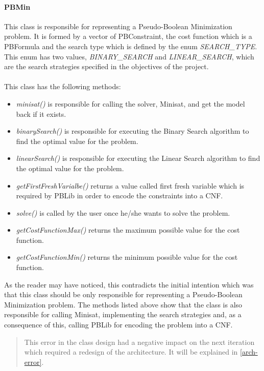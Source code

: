 


\paragraph{PBMin} 

This class is responsible for representing a Pseudo-Boolean Minimization problem.  It is formed by a vector of PBConstraint, the cost function which is a PBFormula and the search type which is defined by the enum \emph{SEARCH\_TYPE}.  \\
This enum has two values, \emph{BINARY\_SEARCH} and \emph{LINEAR\_SEARCH}, which are the search strategies specified in the objectives of the project.  \\\\
This class has the following methods: 
\begin{itemize}
	\item \emph{minisat()} is responsible for calling the solver, Minisat, and get the model back if it exists.
	\item \emph{binarySearch()} is responsible for executing the Binary Search algorithm to find the optimal value for the problem.
	\item \emph{linearSearch()} is responsible for executing the Linear Search algorithm to find the optimal value for the problem.
	\item \emph{getFirstFreshVarialbe()} returns a value called first fresh variable which is required by PBLib in order to encode the constraints into a CNF.
	\item \emph{solve()} is called by the user once he/she wants to solve the problem.
	\item \emph{getCostFunctionMax()} returns the maximum possible value for the cost function.
	\item \emph{getCostFunctionMin()} returns the minimum possible value for the cost function.
\end{itemize}
As the reader may have noticed, this contradicts the initial intention which was that this class should be only responsible for representing a Pseudo-Boolean Minimization problem. The methods listed above show that the class is also responsible for calling Minisat, implementing the search strategies and, as a consequence of this, calling PBLib for encoding the problem into a CNF.  

\begin{verse}
	This error in the class design had a negative impact on the next iteration which required a redesign of the architecture. It will be explained in \ref{arch-error}.
\end{verse}

